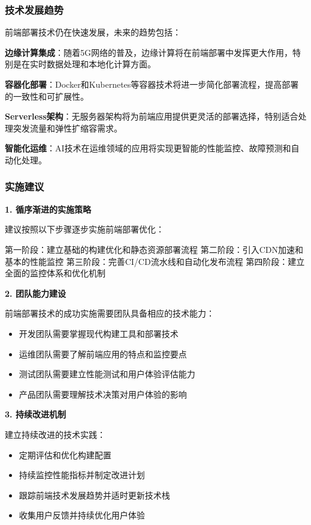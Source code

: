 \subsubsection{技术发展趋势}\label{ux6280ux672fux53d1ux5c55ux8d8bux52bf}

前端部署技术仍在快速发展，未来的趋势包括：

\textbf{边缘计算集成}：随着5G网络的普及，边缘计算将在前端部署中发挥更大作用，特别是在实时数据处理和本地化计算方面。

\textbf{容器化部署}：Docker和Kubernetes等容器技术将进一步简化部署流程，提高部署的一致性和可扩展性。

\textbf{Serverless架构}：无服务器架构将为前端应用提供更灵活的部署选择，特别适合处理突发流量和弹性扩缩容需求。

\textbf{智能化运维}：AI技术在运维领域的应用将实现更智能的性能监控、故障预测和自动化处理。

\subsubsection{实施建议}\label{ux5b9eux65bdux5efaux8bae}

\textbf{1. 循序渐进的实施策略}

建议按照以下步骤逐步实施前端部署优化：

第一阶段：建立基础的构建优化和静态资源部署流程 第二阶段：引入CDN加速和基本的性能监控 第三阶段：完善CI/CD流水线和自动化发布流程 第四阶段：建立全面的监控体系和优化机制

\textbf{2. 团队能力建设}

前端部署技术的成功实施需要团队具备相应的技术能力：

\begin{itemize}
\tightlist
\item
  开发团队需要掌握现代构建工具和部署技术
\item
  运维团队需要了解前端应用的特点和监控要点
\item
  测试团队需要建立性能测试和用户体验评估能力
\item
  产品团队需要理解技术决策对用户体验的影响
\end{itemize}

\textbf{3. 持续改进机制}

建立持续改进的技术实践：

\begin{itemize}
\tightlist
\item
  定期评估和优化构建配置
\item
  持续监控性能指标并制定改进计划
\item
  跟踪前端技术发展趋势并适时更新技术栈
\item
  收集用户反馈并持续优化用户体验
\end{itemize}

